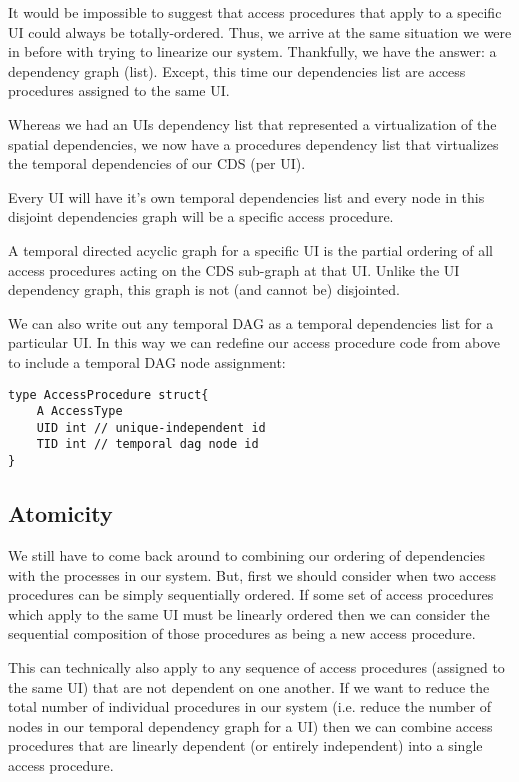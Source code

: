 It would be impossible to suggest that access procedures that apply to a specific UI could always be totally-ordered. Thus, we arrive at the same situation we were in before with trying to linearize our system. Thankfully, we have the answer: a dependency graph (list). Except, this time our dependencies list are access procedures assigned to the same UI.

Whereas we had an UIs dependency list that represented a virtualization of the spatial dependencies, we now have a procedures dependency list that virtualizes the temporal dependencies of our CDS (per UI). 

Every UI will have it's own temporal dependencies list and every node in this disjoint dependencies graph will be a specific access procedure.

\begin{con-def}
	\label{temporal-dag}
	A temporal directed acyclic graph for a specific UI is the partial ordering of all access procedures acting on the CDS sub-graph at that UI. Unlike the UI dependency graph, this graph is not (and cannot be) disjointed.
\end{con-def}

We can also write out any temporal DAG as a temporal dependencies list for a particular UI. In this way we can redefine our access procedure code from above to include a temporal DAG node assignment:

\begin{verbatim}
type AccessProcedure struct{
	A AccessType
	UID int // unique-independent id
	TID int // temporal dag node id
}
\end{verbatim}

\subsection{Atomicity}

We still have to come back around to combining our ordering of dependencies with the processes in our system. But, first we should consider when two access procedures can be simply sequentially ordered. If some set of access procedures which apply to the same UI must be linearly ordered then we can consider the sequential composition of those procedures as being a new access procedure.

This can technically also apply to any sequence of access procedures (assigned to the same UI) that are not dependent on one another. If we want to reduce the total number of individual procedures in our system (i.e. reduce the number of nodes in our temporal dependency graph for a UI) then we can combine access procedures that are linearly dependent (or entirely independent) into a single access procedure.

